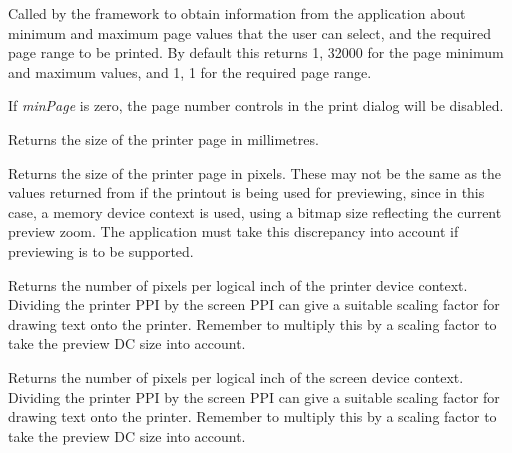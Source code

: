 

Called by the framework to obtain information from the application about minimum and maximum page values that
the user can select, and the required page range to be printed. By default this
returns 1, 32000 for the page minimum and maximum values, and 1, 1 for the required page range.

If {\it minPage} is zero, the page number controls in the print dialog will be disabled.



Returns the size of the printer page in millimetres.



Returns the size of the printer page in pixels. These may not be the
same as the values returned from  if
the printout is being used for previewing, since in this case, a
memory device context is used, using a bitmap size reflecting the current
preview zoom. The application must take this discrepancy into account if
previewing is to be supported.



Returns the number of pixels per logical inch of the printer device context.
Dividing the printer PPI by the screen PPI can give a suitable scaling
factor for drawing text onto the printer. Remember to multiply
this by a scaling factor to take the preview DC size into account.



Returns the number of pixels per logical inch of the screen device context.
Dividing the printer PPI by the screen PPI can give a suitable scaling
factor for drawing text onto the printer. Remember to multiply
this by a scaling factor to take the preview DC size into account.

